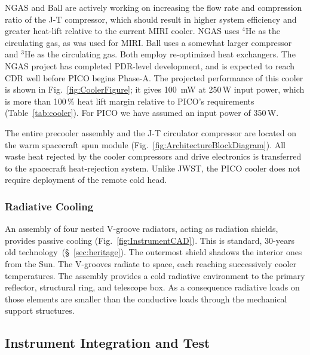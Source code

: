 NGAS and Ball are actively working on increasing the flow rate and compression ratio of the J-T compressor,  which should result in higher system efficiency and greater heat-lift relative to the current MIRI cooler.  NGAS uses $^4$He as the circulating gas, as was used for MIRI. Ball uses a somewhat larger compressor and $^3$He as the circulating gas. Both employ re-optimized heat exchangers. The NGAS project has completed PDR-level development, and is expected to reach CDR well before PICO begins Phase-A. The projected performance of this cooler is shown in Fig.~\ref{fig:CoolerFigure}; it gives 100~mW at 250\,W input power, which is more than 100\,\% heat lift margin relative to PICO's requirements (Table~\ref{tab:cooler}). For PICO we have assumed an input power of 350\,W.

The entire precooler assembly and the J-T circulator compressor are located on the warm spacecraft spun module (Fig.~\ref{fig:ArchitectureBlockDiagram}).
All waste heat rejected by the cooler compressors and drive electronics is transferred to the spacecraft heat-rejection system. Unlike JWST, the PICO cooler does not require deployment of the remote cold head.

\smallskip
\subsubsection{Radiative Cooling}
\label{sec:radiative_cooling} %

An assembly of four nested V-groove radiators, acting as radiation shields, provides passive cooling (Fig.~\ref{fig:InstrumentCAD}). This is standard, 30-years old technology~(\S~\ref{sec:heritage}). The outermost shield shadows the interior ones from the Sun. The V-grooves radiate to space, each reaching successively cooler temperatures. The assembly provides a cold radiative environment to the primary reflector, structural ring, and telescope box. As a consequence radiative loads on those elements are smaller than the conductive loads through the mechanical support structures.


\subsection{Instrument Integration and Test}
\label{sec:iandt} %


